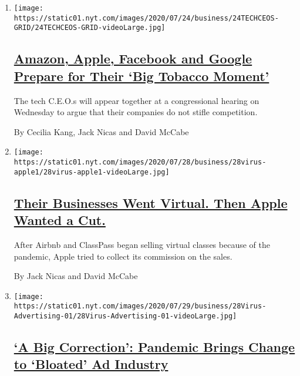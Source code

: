 \begin{enumerate}
\def\labelenumi{\arabic{enumi}.}
\item
  \texttt{[image: https://static01.nyt.com/images/2020/07/24/business/24TECHCEOS-GRID/24TECHCEOS-GRID-videoLarge.jpg]}

  \hypertarget{amazon-apple-facebook-and-google-prepare-for-their-big-tobacco-moment}{%
  \subsection{\texorpdfstring{\href{/2020/07/28/technology/amazon-apple-facebook-google-antitrust-hearing.html}{Amazon,
  Apple, Facebook and Google Prepare for Their `Big Tobacco
  Moment'}}{Amazon, Apple, Facebook and Google Prepare for Their `Big Tobacco Moment'}}\label{amazon-apple-facebook-and-google-prepare-for-their-big-tobacco-moment}}

  The tech C.E.O.s will appear together at a congressional hearing on
  Wednesday to argue that their companies do not stifle competition.

  By Cecilia Kang, Jack Nicas and David McCabe
\item
  \texttt{[image: https://static01.nyt.com/images/2020/07/28/business/28virus-apple1/28virus-apple1-videoLarge.jpg]}

  \hypertarget{their-businesses-went-virtual-then-apple-wanted-a-cut}{%
  \subsection{\texorpdfstring{\href{/2020/07/28/technology/apple-app-store-airbnb-classpass.html}{Their
  Businesses Went Virtual. Then Apple Wanted a
  Cut.}}{Their Businesses Went Virtual. Then Apple Wanted a Cut.}}\label{their-businesses-went-virtual-then-apple-wanted-a-cut}}

  After Airbnb and ClassPass began selling virtual classes because of
  the pandemic, Apple tried to collect its commission on the sales.

  By Jack Nicas and David McCabe
\item
  \texttt{[image: https://static01.nyt.com/images/2020/07/29/business/28Virus-Advertising-01/28Virus-Advertising-01-videoLarge.jpg]}

  \hypertarget{a-big-correction-pandemic-brings-change-to-bloated-ad-industry}{%
  \subsection{\texorpdfstring{\href{/2020/07/28/business/media/coronavirus-pandemic-advertising-industry.html}{`A
  Big Correction': Pandemic Brings Change to `Bloated' Ad
  Industry}}{`A Big Correction': Pandemic Brings Change to `Bloated' Ad Industry}}\label{a-big-correction-pandemic-brings-change-to-bloated-ad-industry}}


\end{enumerate}
